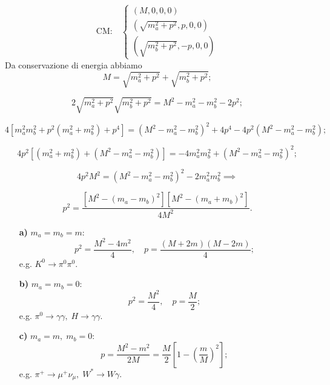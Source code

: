 \[
\text{CM:} \quad
\begin{cases}
(M, 0, 0, 0) \\
\left(\sqrt{m_a^2 + p^2}, p, 0, 0 \right) \\
\left(\sqrt{m_b^2 + p^2}, -p, 0, 0 \right)
\end{cases}
\]
Da conservazione di energia  abbiamo 
\[
M = \sqrt{m_a^2 + p^2} + \sqrt{m_b^2 + p^2};
\]

\[
2 \sqrt{m_a^2 + p^2} \sqrt{m_b^2 + p^2} = M^2 - m_a^2 - m_b^2 - 2p^2;
\]

\[
4 \left[ m_a^2 m_b^2 + p^2 \left( m_a^2 + m_b^2 \right) + p^4 \right] 
= \left( M^2 - m_a^2 - m_b^2 \right)^2 + 4 p^4 - 4p^2 \left( M^2 - m_a^2 - m_b^2 \right);
\]

\[
4p^2 \left[ \left( m_a^2 + m_b^2 \right) + \left( M^2 - m_a^2 - m_b^2 \right) \right] 
= -4m_a^2 m_b^2 + \left( M^2 - m_a^2 - m_b^2 \right)^2;
\]

\[
4p^2 M^2 = \left( M^2 - m_a^2 - m_b^2 \right)^2 - 2m_a^2 m_b^2 
\implies
\]

\[
p^2 = \frac{\left[ M^2 - (m_a - m_b)^2 \right] \left[ M^2 - (m_a + m_b)^2 \right]}{4M^2}.
\]

\begin{enumerate}
    \item[\textbf{a)}] \( m_a = m_b = m \):  
    \[
    p^2 = \frac{M^2 - 4m^2}{4}, \quad p = \frac{(M + 2m)(M - 2m)}{4};
    \]  
    e.g. \( K^0 \to \pi^0 \pi^0 \).

    \item[\textbf{b)}] \( m_a=m_b = 0 \):  
    \[
    p^2 = \frac{M^2}{4}, \quad p = \frac{M}{2};
    \]  
    e.g. \( \pi^0 \to \gamma \gamma, \; H \to \gamma \gamma \).

    \item[\textbf{c)}] \( m_a = m, \; m_b = 0 \):  
    \[
    p = \frac{M^2 - m^2}{2M} = \frac{M}{2} \left[ 1 - \left( \frac{m}{M} \right)^2 \right];
    \]  
    e.g. \( \pi^+ \to \mu^+ \nu_\mu, \; W^* \to W \gamma \).
\end{enumerate}

